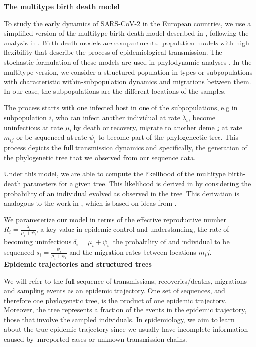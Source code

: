 \textbf{The multitype birth death model}

To study the early dynamics of SARS-CoV-2 in the European countries, we use a simplified version of the multitype birth-death model described in \cite{Kuhnert2016}, following the analysis in \cite{Nadeau2020}. Birth death models are compartmental population models with high flexibility that describe the process of epidemiological transmission. The stochastic formulation of these models are used in phylodynamic analyses \cite{Stadler2012}. In the multitype version, we consider a structured population in types or subpopulations with characteristic within-subpopulation dynamics and migrations between them. In our case, the subpopulations are the different locations of the samples.

The process starts with one infected host in one of the subpopulations, e.g in subpopulation $i$, who can infect another individual at rate $\lambda_i$, become uninfectious at rate $\mu_i$ by death or recovery, migrate to another deme $j$ at rate $m_{ij}$ or be sequenced at rate $\psi_i$ to become part of the phylogenectic tree. This process depicts the full transmission dynamics and specifically, the generation of the phylogenetic tree that we observed from our sequence data. 

Under this model, we are able to compute the likelihood of the multitype birth-death parameters for a given tree. This likelihood is derived in \cite{Kuhnert2016} by considering the probability of an individual evolved as observed in the tree. This derivation is analogous to the work in \cite{Stadler2013}, which is based on ideas from \cite{Maddison2007}.

We parameterize our model in terms of the effective reproductive number $R_i = \frac{\lambda_i}{\mu_i + \psi_i}$, a key value in epidemic control and understanding, the rate of becoming uninfectious $\delta_i = \mu_i + \psi_i$, the probability of and individual to be sequenced $s_i = \frac{\psi_i}{\mu_i + \psi_i}$ and the migration rates between locations $m_ij$.\\

\textbf{Epidemic trajectories and structured trees}

We will refer to the full sequence of transmissions, recoveries/deaths, migrations and sampling events as an epidemic trajectory. One set of sequences, and therefore one phylogenetic tree, is the product of one epidemic trajectory. Moreover, the tree represents a fraction of the events in the epidemic trajectory, those that involve the sampled individuals. In epidemiology, we aim to learn about the true epidemic trajectory since we usually have incomplete information caused by unreported cases or unknown transmission chains.


